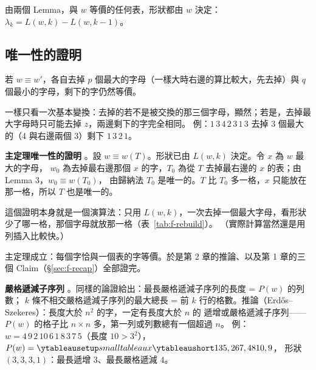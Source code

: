 由兩個 Lemma，與 $w$ 等價的任何表，形狀都由 $w$ 決定：$\lambda_k=L(w,k)-L(w,k-1)$。

\subsection{唯一性的證明}\label{sec:f-unique}

\begin{thmbox}
若 $w\equiv w'$，各自去掉 $p$ 個最大的字母（一樣大時右邊的算比較大，先去掉）與 $q$ 個最小的字母，剩下的字仍然等價。
\end{thmbox}

一樣只看一次基本變換：去掉的若不是被交換的那三個字母，顯然；若是，去掉最大字母時只可能去掉 $z$，兩邊剩下的字完全相同。
例：$1\,3\,4\,2\,3\,1\,3$ 去掉 3 個最大的（4 與右邊兩個 3）剩下 $1\,3\,2\,1$。

\textbf{主定理唯一性的證明} 。設 $w\equiv w(T)$。形狀已由 $L(w,k)$ 決定。令 $x$ 為 $w$ 最大的字母，
$w_0$ 為去掉最右邊那個 $x$ 的字，$T_0$ 為從 $T$ 去掉最右邊的 $x$ 的表；由 Lemma 3，$w_0\equiv w(T_0)$，
由歸納法 $T_0$ 是唯一的。$T$ 比 $T_0$ 多一格，$x$ 只能放在那一格，所以 $T$ 也是唯一的。

這個證明本身就是一個演算法：只用 $L(w,k)$，一次去掉一個最大字母，看形狀少了哪一格，那個字母就放那一格（表~\ref{tab:f-rebuild}）。
（實際計算當然還是用列插入比較快。）

\begin{table}[H]
\centering
\FulRebuild
\caption{由 $L(w,k)$ 重建 $P(w)$：第 $p$ 列是去掉 $p$ 個最大字母後的字 $w_p$；它的形狀比 $w_{p+1}$ 多出的那一格，就是 $w_p$ 最大字母的位置。
由下往上填回去，得到圖~\ref{fig:f-increasing} 右邊的 $P(w)$。}
\label{tab:f-rebuild}
\end{table}

\begin{keybox}[到這裡]
主定理成立：每個字恰與一個表的字等價。於是第 2 章的推論、以及第 1 章的三個 Claim（\S\ref{sec:f-recap}）全部證完。
\end{keybox}

\textbf{嚴格遞減子序列} 。同樣的論證給出：最長嚴格遞減子序列的長度 = $P(w)$ 的列數；
$k$ 條不相交嚴格遞減子序列的最大總長 = 前 $k$ 行的格數。推論（Erdős–Szekeres）：長度大於 $n^2$ 的字，一定有長度大於 $n$ 的
遞增或嚴格遞減子序列——$P(w)$ 的格子比 $n\times n$ 多，第一列或列數總有一個超過 $n$。
例：$w=4\,9\,2\,10\,6\,1\,8\,3\,7\,5$（長度 $10>3^2$），$P(w)=\yts{135,267,48{10},9}$，
形狀 $(3,3,3,1)$：最長遞增 3、最長嚴格遞減 4。

